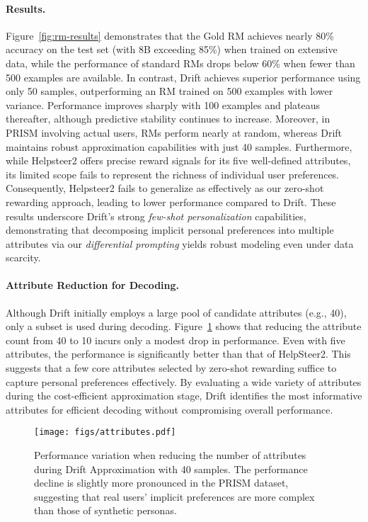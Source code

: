 \paragraph{Results.}
Figure~\ref{fig:rm-results} demonstrates that the Gold RM achieves nearly 80\% accuracy on the test set (with 8B exceeding 85\%) when trained on extensive data, while the performance of standard RMs drops below 60\% when fewer than 500 examples are available. In contrast, Drift achieves superior performance using only 50 samples, outperforming an RM trained on 500 examples with lower variance. Performance improves sharply with 100 examples and plateaus thereafter, although predictive stability continues to increase. Moreover, in PRISM involving actual users, RMs perform nearly at random, whereas Drift maintains robust approximation capabilities with just 40 samples. 
Furthermore, while Helpsteer2 offers precise reward signals for its five well-defined attributes, its limited scope fails to represent the richness of individual user preferences. Consequently, Helpsteer2 fails to generalize as effectively as our zero-shot rewarding approach, leading to lower performance compared to Drift.
These results underscore Drift’s strong \textit{few-shot personalization} capabilities, demonstrating that decomposing implicit personal preferences into multiple attributes via our \textit{differential prompting} yields robust modeling even under data scarcity.

\paragraph{Attribute Reduction for Decoding.}
\label{sec:practical-1}
Although Drift initially employs a large pool of candidate attributes (e.g., 40), only a subset is used during decoding. Figure~\ref{fig:attributes_num} shows that reducing the attribute count from 40 to 10 incurs only a modest drop in performance. Even with five attributes, the performance is significantly better than that of HelpSteer2. This suggests that a few core attributes selected by zero-shot rewarding suffice to capture personal preferences effectively. By evaluating a wide variety of attributes during the cost-efficient approximation stage, Drift identifies the most informative attributes for efficient decoding without compromising overall performance.


\begin{figure}[ht]
\centering
\texttt{[image: figs/attributes.pdf]}
\caption{Performance variation when reducing the number of attributes during Drift Approximation with 40 samples. The performance decline is slightly more pronounced in the PRISM dataset, suggesting that real users’ implicit preferences are more complex than those of synthetic personas.}

\label{fig:attributes_num}
\vspace{-5mm}
\end{figure}

